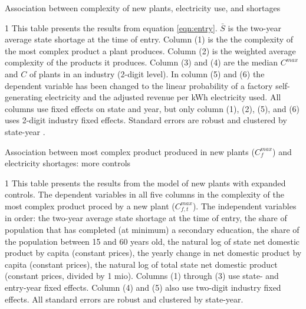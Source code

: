 \documentclass[11pt]{article}
\begin{document}
\begin{table} 
	\begin{center}
		\begin{threeparttable}
			\caption{Association between complexity of new plants, electricity use, and shortages}
			\label{tab:entry_min}
			
			\begin{tablenotes} \footnotesize 
			\item[1] This table presents the results from equation \ref{eqn:entry}. $\bar{S}$ is the two-year average state shortage at the time of entry. Column (1) is the the complexity of the most complex product a plant produces. Column (2) is the weighted average complexity of the products it produces. Column (3) and (4) are the median $C^{max}$ and $C$ of plants in an industry (2-digit level). In column (5) and (6) the dependent variable has been changed to the linear probability of a factory self-generating electricity and the adjusted revenue per kWh electricity used. All columns use fixed effects on state and year, but only column (1), (2), (5), and (6) uses 2-digit industry fixed effects. Standard errors are robust and clustered by state-year .
			\end{tablenotes}
		\end{threeparttable}
	\end{center}
\end{table}   


\begin{table} 
	\begin{center}
		\begin{threeparttable}
			\caption{Association between most complex product produced in new plants ($C^{max}_{f}$) and electricity shortages: more controls}
			\label{tab:entry_max_max}
			
			\begin{tablenotes} \footnotesize 
			\item[1] This table presents the results from the model of new plants with expanded controls. The dependent variables in all five columns in the complexity of the most complex product proced by a new plant ($C^{max}_{f,t}$). The independent variables in order: the two-year average state shortage at the time of entry, the share of population that has completed (at minimum) a secondary education, the share of the population between 15 and 60 years old, the natural log of state net domestic product by capita (constant prices), the yearly change in net domestic product by capita (constant prices), the natural log of total state net domestic product (constant prices, divided by 1 mio). Columns (1) through (3) use state- and entry-year fixed effects. Column (4) and (5) also use two-digit industry fixed effects. All standard errors are robust and clustered by state-year.
			\end{tablenotes}
		\end{threeparttable}
	\end{center}
\end{table}   
\end{document}
